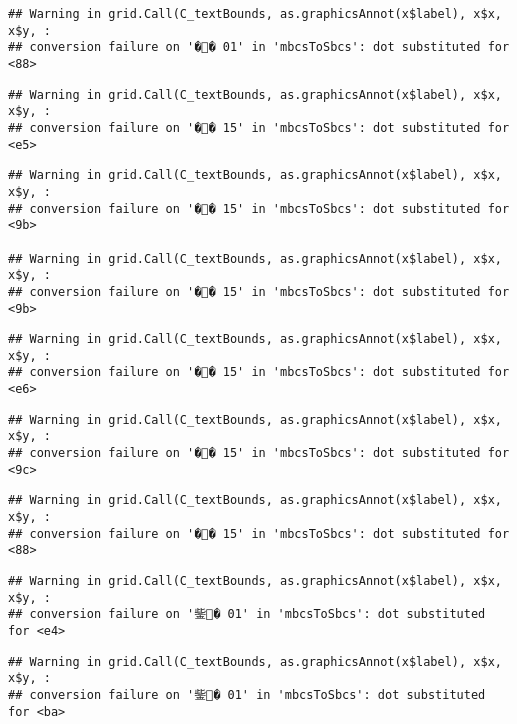 \documentclass[]{article}
\begin{document}
\begin{verbatim}
## Warning in grid.Call(C_textBounds, as.graphicsAnnot(x$label), x$x, x$y, :
## conversion failure on '�� 01' in 'mbcsToSbcs': dot substituted for <88>
\end{verbatim}

\begin{verbatim}
## Warning in grid.Call(C_textBounds, as.graphicsAnnot(x$label), x$x, x$y, :
## conversion failure on '�� 15' in 'mbcsToSbcs': dot substituted for <e5>
\end{verbatim}

\begin{verbatim}
## Warning in grid.Call(C_textBounds, as.graphicsAnnot(x$label), x$x, x$y, :
## conversion failure on '�� 15' in 'mbcsToSbcs': dot substituted for <9b>

## Warning in grid.Call(C_textBounds, as.graphicsAnnot(x$label), x$x, x$y, :
## conversion failure on '�� 15' in 'mbcsToSbcs': dot substituted for <9b>
\end{verbatim}

\begin{verbatim}
## Warning in grid.Call(C_textBounds, as.graphicsAnnot(x$label), x$x, x$y, :
## conversion failure on '�� 15' in 'mbcsToSbcs': dot substituted for <e6>
\end{verbatim}

\begin{verbatim}
## Warning in grid.Call(C_textBounds, as.graphicsAnnot(x$label), x$x, x$y, :
## conversion failure on '�� 15' in 'mbcsToSbcs': dot substituted for <9c>
\end{verbatim}

\begin{verbatim}
## Warning in grid.Call(C_textBounds, as.graphicsAnnot(x$label), x$x, x$y, :
## conversion failure on '�� 15' in 'mbcsToSbcs': dot substituted for <88>
\end{verbatim}

\begin{verbatim}
## Warning in grid.Call(C_textBounds, as.graphicsAnnot(x$label), x$x, x$y, :
## conversion failure on '鈭� 01' in 'mbcsToSbcs': dot substituted for <e4>
\end{verbatim}

\begin{verbatim}
## Warning in grid.Call(C_textBounds, as.graphicsAnnot(x$label), x$x, x$y, :
## conversion failure on '鈭� 01' in 'mbcsToSbcs': dot substituted for <ba>
\end{verbatim}
\end{document}
